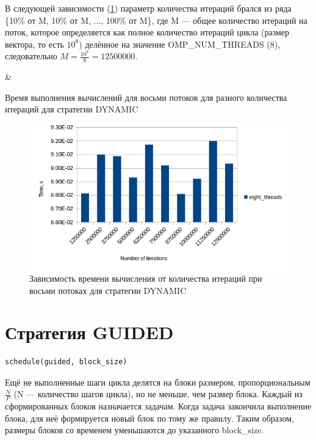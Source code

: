 В следующей зависимости (\ref{fig:dynamicm}) параметр количества итераций брался из ряда \{10\% от M, 10\% от M, ..., 100\% от M\}, где M --- общее количество итераций на поток, которое определяется как полное количество итераций цикла (размер вектора, то есть $10^8$) делённое на значение OMP\_NUM\_THREADS (8), следовательно $M = \frac{10^8}{8} = 12500000$.

\begin{table}[h]
  \centering
  {\iterations & \time}

  \caption{Время выполнения вычислений для восьми потоков для разного количества итераций для стратегии DYNAMIC}
  \label{tab:dynamicm}
\end{table}

\begin{figure}[h]
  \centering
  \includegraphics[width=.75\textwidth]{dynamic_m.png}
  \caption{Зависимость времени вычисления от количества итераций при восьми потоках для стратегии DYNAMIC}
\label{fig:dynamicm}
\end{figure}

\chapter{Стратегия GUIDED}

\lstset{language=C}
\begin{lstlisting}
schedule(guided, block_size)
\end{lstlisting}

Ещё не выполненные шаги цикла делятся на блоки размером, пропорциональным $\frac{N}{P}$ (N --- количество шагов цикла), но не меньше, чем размер блока. Каждый из сформированных блоков назначается задачам. Когда задача закончила выполнение блока, для неё формируется новый блок по тому же правилу. Таким образом, размеры блоков со временем уменьшаются до указанного block\_size.

